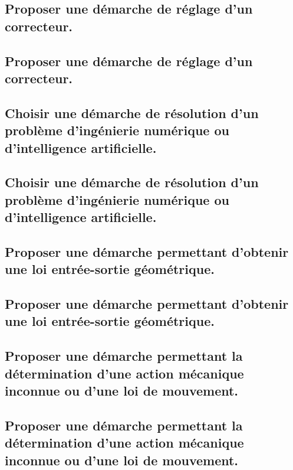 \documentclass[10pt,fleqn]{book}
\newcommand{\repRel}{../..}
\newcommand{\repStyle}{\repRel/Style}
\newcommand{\td}{fichier_td}
\newcommand{\repExos}{\repRel/ExercicesCompetences}
\newcommand{\repExo}{dossier}
\begin{document}
\subsection{Proposer une démarche de réglage d'un correcteur.} 

\subsection{Proposer une démarche de réglage d'un correcteur.} 

\renewcommand{\repExo}{\repExos/C1_ProposerDemarche/C1_02_ProposerDemarcheReglageCorrecteur/50_BancBalafre}
\renewcommand{\td}{50_BancBalafre}
\graphicspath{{\repStyle/png/}{\repExo/images/}}


\subsection{Choisir une démarche de résolution d’un problème d'ingénierie numérique ou d'intelligence artificielle. } 

\subsection{Choisir une démarche de résolution d’un problème d'ingénierie numérique ou d'intelligence artificielle. } 

\subsection{Proposer une démarche permettant d'obtenir une loi entrée-sortie géométrique. } 

\subsection{Proposer une démarche permettant d'obtenir une loi entrée-sortie géométrique. } 

\subsection{Proposer une démarche permettant la détermination d’une action mécanique inconnue ou d'une loi de mouvement.} 

\subsection{Proposer une démarche permettant la détermination d’une action mécanique inconnue ou d'une loi de mouvement.} 
\end{document}
